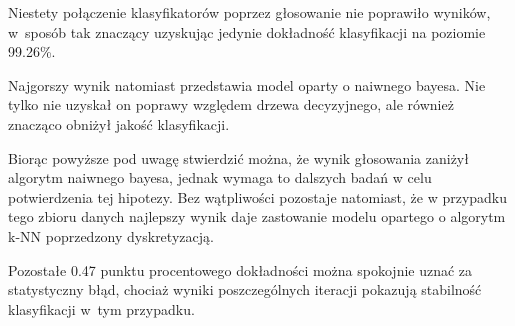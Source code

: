 \documentclass[12pt,oneside,a4paper]{book} %
\theoremstyle{break}
\begin{document}
Niestety połączenie klasyfikatorów poprzez głosowanie nie poprawiło wyników, w~sposób tak znaczący uzyskując jedynie dokładność klasyfikacji na poziomie 99.26\%.

Najgorszy wynik natomiast przedstawia model oparty o naiwnego bayesa. Nie tylko nie uzyskał on poprawy względem drzewa decyzyjnego, ale również znacząco obniżył jakość klasyfikacji.

Biorąc powyższe pod uwagę stwierdzić można, że wynik głosowania zaniżył algorytm naiwnego bayesa, jednak wymaga to dalszych badań w celu potwierdzenia tej hipotezy.
Bez wątpliwości pozostaje natomiast, że w przypadku tego zbioru danych najlepszy wynik daje zastowanie modelu opartego o algorytm k-NN poprzedzony dyskretyzacją.

Pozostałe 0.47 punktu procentowego dokładności można spokojnie uznać za statystyczny błąd, chociaż wyniki poszczególnych iteracji pokazują stabilność klasyfikacji w~tym przypadku.
\end{document}
